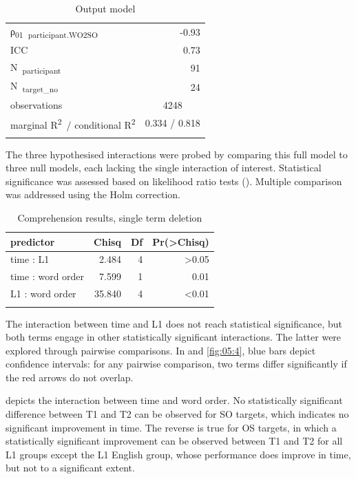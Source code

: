 \begin{table}
\begin{tabularx}{\textwidth}{Xrrr}
    ρ\textsubscript{01}~\textsubscript{participant.WO2SO} & \multicolumn{3}{r}{{}-0.93}\\
    ICC & \multicolumn{3}{r}{0.73}\\
    N~\textsubscript{participant} & \multicolumn{3}{r}{91}\\
    N~\textsubscript{target\_no} & \multicolumn{3}{r}{24}\\
    \midrule
    observations & \multicolumn{3}{c}{4248}\\
    marginal R\textsuperscript{2}~/ conditional R\textsuperscript{2} & \multicolumn{3}{c}{0.334 / 0.818}\\
    \lspbottomrule
    \end{tabularx}
    \caption{Output model}
    \label{tab:05:3}
\end{table}

The three hypothesised interactions were probed by comparing this full model to three null models, each lacking the single interaction of interest. Statistical significance was assessed based on likelihood ratio tests (). Multiple comparison was addressed using the Holm correction.

\begin{table}
    \begin{tabularx}{\textwidth}{Xrrr}
    \lsptoprule
    predictor & Chisq & Df & Pr(>Chisq)\\
    \midrule
    time : L1 & 2.484 & 4 & >0.05\\
    time : word order & 7.599 & 1 & 0.01\\
    L1 : word order & 35.840 & 4 & <0.01\\
    \lspbottomrule
    \end{tabularx}
    \caption{Comprehension results, single term deletion}
    \label{tab:05:4}
\end{table}

The interaction between time and L1 does not reach statistical significance, but both terms engage in other statistically significant interactions. The latter were explored through pairwise comparisons. In  and \ref{fig:05:4}, blue bars depict confidence intervals: for any pairwise comparison, two terms differ significantly if the red arrows do not overlap.

 depicts the interaction between time and word order. No statistically significant difference between T1 and T2 can be observed for SO targets, which indicates no significant improvement in time. The reverse is true for OS targets, in which a statistically significant improvement can be observed between T1 and T2 for all L1 groups except the L1 English group, whose performance does improve in time, but not to a significant extent.

